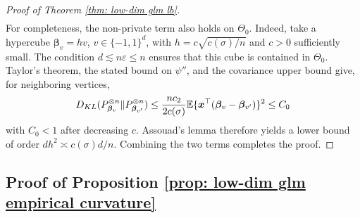 \documentclass[letterpaper,12pt]{article}
\numberwithin{equation}{section}
\theoremstyle{plain}
\numberwithin{Theorem}{section}
\numberwithin{proposition}{section}
\numberwithin{Lemma}{section}
{
	\theoremstyle{definition}
	\newtheorem{Definition}{Definition}
	\newtheorem{example}{Example}
	\numberwithin{example}{section}
	\newtheorem{fact}{Fact}
	\numberwithin{fact}{section}
	\newtheorem{remark}{Remark}
}
\newcommand{\1}{\mathbbm{1}}
\def\bbeta{{\boldsymbol{\beta}}}
\def\E{\mathbb{E}}
\begin{document}
\begin{proof}[Proof of Theorem \ref{thm: low-dim glm lb}]
\begin{align*}
	\end{align*}
	{For completeness, the non-private term also holds on $\Theta_0$. Indeed, take a hypercube $\bbeta_v=h v$, $v\in\{-1,1\}^d$, with $h=c\sqrt{c(\sigma)/n}$ and $c>0$ sufficiently small. The condition $d\lesssim n\varepsilon\leq n$ ensures that this cube is contained in $\Theta_0$. Taylor's theorem, the stated bound on $\psi''$, and the covariance upper bound give, for neighboring vertices,
	\[
	D_{\rm KL}(P_{\bbeta_v}^{\otimes n}\|P_{\bbeta_{v'}}^{\otimes n})
	\leq \frac{nc_2}{2c(\sigma)}\E\{\bm x^\top(\bbeta_v-\bbeta_{v'})\}^2\leq C_0
	\]
	with $C_0<1$ after decreasing $c$. Assouad's lemma therefore yields a lower bound of order $dh^2\asymp c(\sigma)d/n$. Combining the two terms completes the proof.}
\end{proof}

\subsection{Proof of Proposition \ref{prop: low-dim glm empirical curvature}}\label{sec: proof of prop: low-dim glm empirical curvature}
\end{document}
